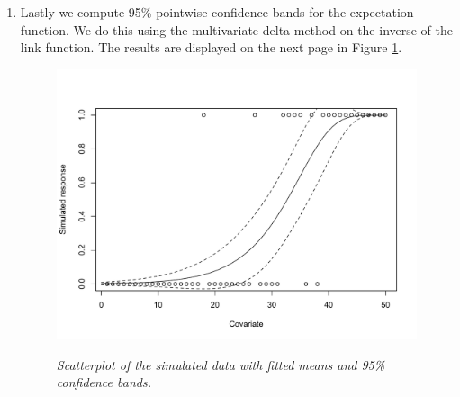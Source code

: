 \documentclass[12pt]{article}
\begin{document}
\begin{enumerate}
  \item  Lastly we compute 95\% pointwise confidence bands for the expectation function. We do this using the multivariate delta method on the
    inverse of the link function. The results are displayed on the next page in Figure \ref{fig:7}.

    \begin{figure}[h]
      \caption{\emph{Scatterplot of the simulated data with fitted means and 95\% confidence bands.}}
      \centering
      \includegraphics[width=.8\textwidth]{./figures/hw03_2_confidence.pdf}
      \label{fig:7}
    \end{figure}

\end{enumerate}
\end{document}
